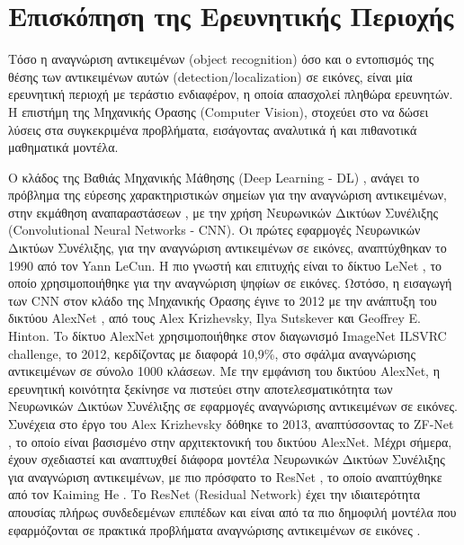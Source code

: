 \chapter{Επισκόπηση της Ερευνητικής Περιοχής}
\label{chapter:sota}
Τόσο η αναγνώριση αντικειμένων (object recognition) όσο και ο εντοπισμός
της θέσης των αντικειμένων αυτών (detection/localization) σε εικόνες,
είναι μία ερευνητική περιοχή με τεράστιο ενδιαφέρον,
η οποία απασχολεί πληθώρα ερευνητών. Η επιστήμη της Μηχανικής Όρασης (Computer Vision), %
στοχεύει στο να δώσει λύσεις στα συγκεκριμένα προβλήματα, εισάγοντας αναλυτικά
ή και πιθανοτικά μαθηματικά μοντέλα.

Ο κλάδος της Βαθιάς Μηχανικής Μάθησης (Deep Learning - DL) \cite{Goodfellow-et-al-2016-Book},
ανάγει το πρόβλημα της εύρεσης χαρακτηριστικών σημείων για την αναγνώριση αντικειμένων,
στην εκμάθηση αναπαραστάσεων \cite{bengio2013representation},
με την χρήση Νευρωνικών Δικτύων Συνέλιξης (Convolutional Neural Networks - CNN). %
Οι πρώτες εφαρμογές Νευρωνικών Δικτύων Συνέλιξης, για την αναγνώριση αντικειμένων
σε εικόνες, αναπτύχθηκαν το 1990 από τον Yann LeCun.
Η πιο γνωστή και επιτυχής είναι το δίκτυο LeNet \cite{lecun1998gradient}, το οποίο
χρησιμοποιήθηκε για την αναγνώριση ψηφίων σε εικόνες.
Ωστόσο, η εισαγωγή των CNN στον κλάδο της Μηχανικής Όρασης έγινε το 2012 με
την ανάπτυξη του δικτύου AlexNet \cite{NIPS2012_4824}, από τους Alex Krizhevsky,
Ilya Sutskever και Geoffrey E. Hinton. To δίκτυο AlexNet χρησιμοποιήθηκε
στον διαγωνισμό ImageNet ILSVRC challenge, το 2012, κερδίζοντας με διαφορά
10,9\%, στο σφάλμα αναγνώρισης αντικειμένων σε σύνολο 1000 κλάσεων.
Με την εμφάνιση του δικτύου AlexNet, η ερευνητική κοινότητα ξεκίνησε να
πιστεύει στην αποτελεσματικότητα των Νευρωνικών Δικτύων Συνέλιξης σε εφαρμογές αναγνώρισης
αντικειμένων σε εικόνες. Συνέχεια στο έργο του Alex Krizhevsky δόθηκε το 2013,
αναπτύσσοντας το ZF-Net \cite{DBLP:journals/corr/ZeilerF13}, το οποίο είναι
βασισμένο στην αρχιτεκτονική του δικτύου AlexNet. Μέχρι σήμερα, έχουν σχεδιαστεί
και αναπτυχθεί διάφορα μοντέλα Νευρωνικών Δικτύων Συνέλιξης για
αναγνώριση αντικειμένων, με πιο πρόσφατο το ResNet ,
το οποίο αναπτύχθηκε από τον Kaiming He \cite{DBLP:journals/corr/HeZRS15}.
Το ResNet (Residual Network) έχει την
ιδιαιτερότητα απουσίας πλήρως συνδεδεμένων επιπέδων και είναι από τα πιο δημοφιλή
μοντέλα που εφαρμόζονται σε πρακτικά προβλήματα αναγνώρισης αντικειμένων σε
εικόνες \cite{DBLP:journals/corr/HeZR016}.

